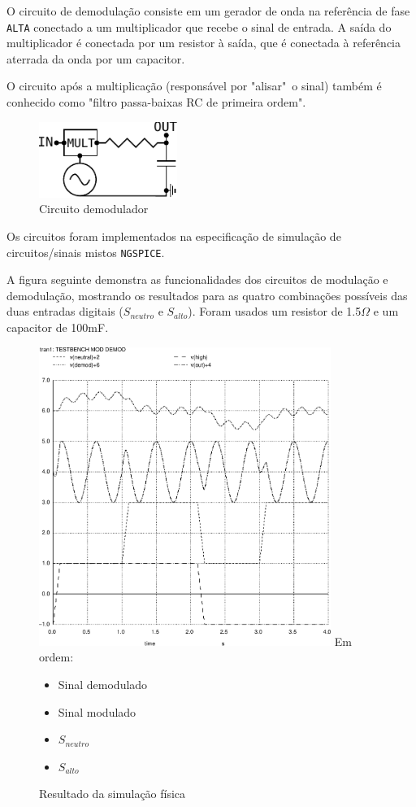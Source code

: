 \documentclass[titlepage,twocolumn]{article}
\begin{document}
O circuito de demodulação consiste em um gerador de onda na referência de fase \texttt{ALTA} conectado a um multiplicador que recebe o sinal de entrada. A saída do multiplicador é conectada por um resistor à saída, que é conectada à referência aterrada da onda por um capacitor.

O circuito após a multiplicação (responsável por "alisar"\ o sinal) também é conhecido como "filtro passa-baixas RC de primeira ordem".

\begin{figure}[H]
    \begin{center}
        \includegraphics[width=4.5cm]{imgs/demodulador.pdf}
        \caption{Circuito demodulador}
    \end{center}
\end{figure}


Os circuitos foram implementados na especificação de simulação de circuitos/sinais mistos \texttt{NGSPICE}.

A figura seguinte demonstra as funcionalidades dos circuitos de modulação e demodulação, mostrando os resultados para as quatro combinações possíveis das duas entradas digitais ($S_{neutro}$ e $S_{alto}$). Foram usados um resistor de 1.5$\Omega$ e um capacitor de 100mF.

\begin{figure}[H]
    \begin{center}
        \includegraphics[width=9.5cm]{imgs/modemod.pdf}
        \footnotesize
        Em ordem:
        \begin{itemize}
            \item Sinal demodulado
            \item Sinal modulado
            \item $S_{neutro}$
            \item $S_{alto}$
        \end{itemize}
        \normalsize
        \caption{Resultado da simulação física}
    \end{center}
\end{figure}
\end{document}
